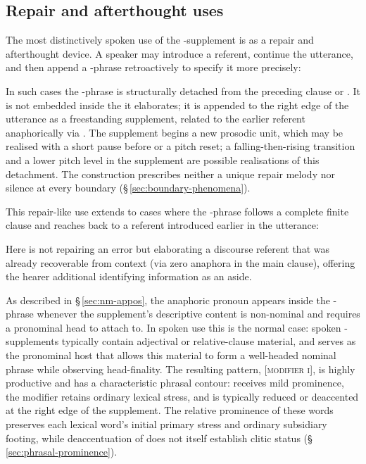 \subsection{Repair and afterthought uses}
\label{sec:spoken-ty-repair}

The most distinctively spoken use of the -supplement is as a repair
and afterthought device. A speaker may introduce a referent, continue the
utterance, and then append a -phrase retroactively to specify it more
precisely:

\pex
{}
\xe


In such cases the -phrase is structurally detached from the preceding
clause or . It is not embedded inside the  it
elaborates; it is appended to the right edge of the utterance as a freestanding
supplement, related to the earlier referent anaphorically via . The
supplement begins a new prosodic unit, which may be realised with a short
pause before  or a pitch reset; a falling-then-rising transition and
a lower pitch level in the supplement are possible realisations of this
detachment. The construction prescribes neither a unique repair melody nor
silence at every boundary (§\,\ref{sec:boundary-phenomena}).

This repair-like use extends to cases where the -phrase follows a
complete finite clause and reaches back to a referent introduced earlier in the
utterance:

\pex
\a {}
\xe

Here  is not repairing an error but elaborating a
discourse referent that was already recoverable from context (via zero anaphora
in the main clause), offering the hearer additional identifying information as
an aside.

As described in \S\,\ref{sec:nm-appos}, the anaphoric pronoun 
appears inside the -phrase whenever the supplement's descriptive content
is non-nominal and requires a pronominal head to attach to. In spoken use this
is the normal case: spoken -supplements typically contain adjectival or
relative-clause material, and  serves as the pronominal host that allows
this material to form a well-headed nominal phrase while observing
head-finality. The resulting pattern,  \textsc{[modifier i]}, is highly
productive and has a characteristic phrasal contour:  receives mild
prominence, the modifier retains ordinary lexical stress, and  is
typically reduced or deaccented at the right edge of the supplement. The
relative prominence of these words preserves each lexical word's initial
primary stress and ordinary subsidiary footing, while deaccentuation of
 does not itself establish clitic status
(§\,\ref{sec:phrasal-prominence}).

